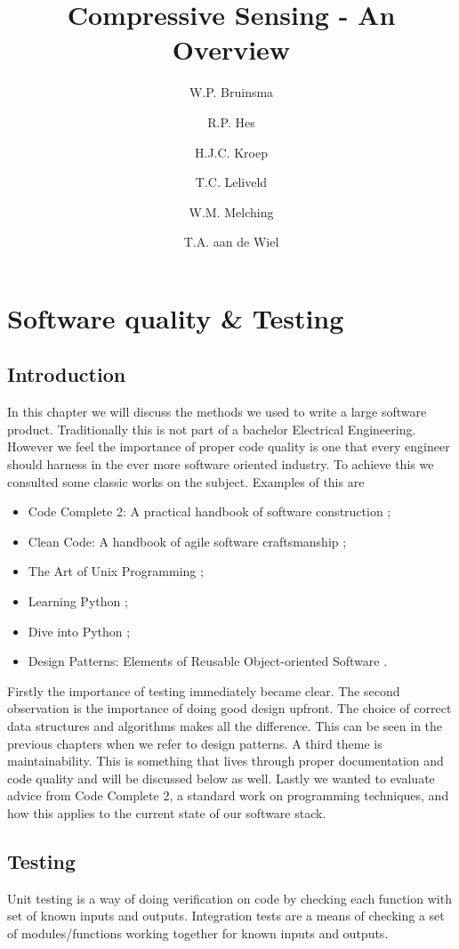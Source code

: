\documentclass[a4paper, openany, oneside]{memoir}
\title{Compressive Sensing - An Overview}
\author{W.P. Bruinsma \and R.P. Hes \and H.J.C. Kroep \and T.C. Leliveld \and W.M. Melching \and T.A. aan de Wiel}
\begin{document}
\chapter{Software quality \& Testing}
\section{Introduction}
In this chapter we will discuss the methods we used to write a large software product. Traditionally this is not part of a bachelor Electrical Engineering. However we feel the importance of proper code quality is one that every engineer should harness in the ever more software oriented industry. To achieve this we consulted some classic works on the subject. Examples of this are
\begin{itemize}
    \item Code Complete 2: A practical handbook of software construction \cite{mcconnell2004code};
    \item Clean Code: A handbook of agile software craftsmanship \cite{martin2008clean};
    \item The Art of Unix Programming \cite{raymond2003art};
    \item Learning Python \cite{lutz2013learning};
    \item Dive into Python \cite{pilgrim2000dive};
    \item Design Patterns: Elements of Reusable Object-oriented Software \cite{designpatterns}.
\end{itemize}
Firstly the importance of testing immediately became clear. The second observation is the importance of doing good design upfront. The choice of correct data structures and algorithms makes all the difference. This can be seen in the previous chapters when we refer to design patterns. A third theme is maintainability. This is something that lives through proper documentation and code quality and will be discussed below as well. Lastly we wanted to evaluate advice from Code Complete 2, a standard work on programming techniques, and how this applies to the current state of our software stack.

\section{Testing}
Unit testing is a way of doing verification on code by checking each function with set of known inputs and outputs. Integration tests are a means of checking a set of modules/functions working together for known inputs and outputs.
\end{document}

